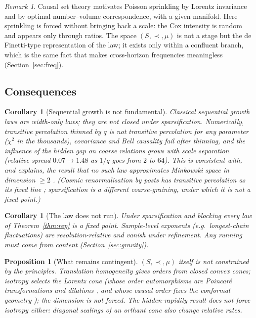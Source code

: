 \documentclass[11pt]{article}
\newtheorem{proposition}[theorem]{Proposition}
\newtheorem{corollary}[theorem]{Corollary}
\theoremstyle{definition}
\theoremstyle{remark}
\newtheorem{remark}[theorem]{Remark}
\begin{document}
\begin{remark}
Causal set theory motivates Poisson sprinkling by Lorentz invariance \cite{bhs} and by optimal number--volume correspondence, with a given manifold. Here sprinkling is forced without bringing back a scale: the Cox intensity is random and appears only through ratios. The space $(S,\prec,\mu)$ is not a stage but the de Finetti-type representation of the law; it exists only within a confluent branch, which is the same fact that makes cross-horizon frequencies meaningless (Section~\ref{sec:freq}).
\end{remark}

\subsection{Consequences}

\begin{corollary}[Sequential growth is not fundamental]
Classical sequential growth laws \cite{rideoutsorkin} are width-only laws; they are not closed under sparsification. Numerically, transitive percolation thinned by $q$ is not transitive percolation for any parameter ($\chi^2$ in the thousands), covariance and Bell causality fail after thinning, and the influence of the hidden gap on coarse relations grows with scale separation (relative spread $0.07\to1.48$ as $1/q$ goes from $2$ to $64$). This is consistent with, and explains, the result that no such law approximates Minkowski space in dimension $\ge2$ \cite{brightwellgeorgiou}. (Cosmic renormalisation by posts has transitive percolation as its fixed line \cite{martin}; sparsification is a different coarse-graining, under which it is not a fixed point.)
\end{corollary}

\begin{corollary}[The law does not run]
Under sparsification and blocking every law of Theorem~\ref{thm:rep} is a fixed point. Sample-level exponents (e.g.\ longest-chain fluctuations) are resolution-relative and vanish under refinement. Any running must come from content (Section~\ref{sec:gravity}).
\end{corollary}

\begin{proposition}[What remains contingent]
$(S,\prec,\mu)$ itself is not constrained by the principles. Translation homogeneity gives orders from closed convex cones; isotropy selects the Lorentz cone (whose order automorphisms are Poincar\'e transformations and dilations \cite{zeeman}, and whose causal order fixes the conformal geometry \cite{malament,hkm}); the dimension is not forced. The hidden-rapidity result does not force isotropy either: diagonal scalings of an orthant cone also change relative rates.
\end{proposition}
\end{document}
